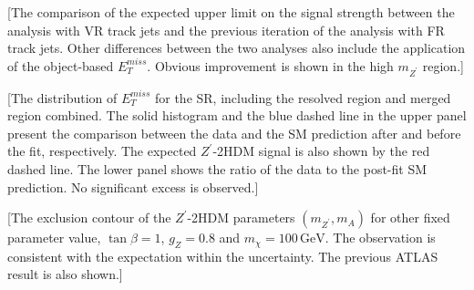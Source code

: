 \documentclass[class=NTHU_thesis, crop=false]{standalone}
\begin{document}
[The comparison of the expected upper limit on the signal strength between the analysis with VR track jets and the previous iteration of the analysis with FR track jets. Other differences between the two analyses also include the application of the object-based $E^{miss}_T$. Obvious improvement is shown in the high $m_{Z^\prime}$ region.]

[The distribution of $E^{miss}_T$ for the SR, including the resolved region and merged region combined. The solid histogram and the blue dashed line in the upper panel present the comparison between the data and the SM prediction after and before the fit, respectively. The expected $Z^\prime$-2HDM signal is also shown by the red dashed line. The lower panel shows the ratio of the data to the post-fit SM prediction. No significant excess is observed.]

[The exclusion contour of the $Z^\prime$-2HDM parameters $(m_{Z^\prime}, m_A)$ for other fixed parameter value, $\tan\beta = 1$, $g_Z = 0.8$ and $m_\chi = 100\, \mathrm{GeV}$. The observation is consistent with the expectation within the uncertainty. The previous ATLAS result is also shown.]
\end{document}
